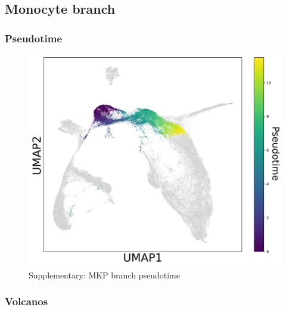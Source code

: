 \documentclass[a4paper]{article}
\begin{document}
\FloatBarrier
\subsection{Monocyte branch}

\subsubsection{Pseudotime}
\begin{figure}[!htb]
  \centering
  \includegraphics[width=\textwidth]{../figures/hematopoiesis/Monocyte_40_15_single_branch_pseudotime.png}
  \caption{Supplementary: MKP branch pseudotime}
\end{figure}

\FloatBarrier
\subsubsection{Volcanos}
\end{document}
